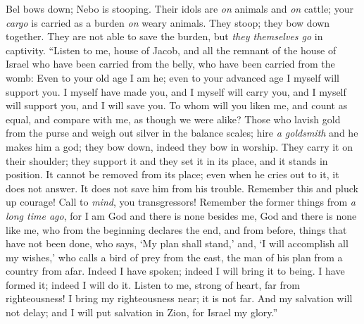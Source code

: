 \begin{biblechapter} %
 Bel bows down; 
Nebo is stooping. 
Their idols are \textit{on} animals and \textit{on} cattle; 
your \textit{cargo} is carried as a burden \textit{on} weary animals.
\verse They stoop; 
they bow down together. 
They are not able to save the burden, 
but \textit{they themselves go} in captivity.
\verse “Listen to me, house of Jacob, 
and all the remnant of the house of Israel 
who have been carried from the belly, 
who have been carried from the womb:
\verse Even to your old age I am he; 
even to your advanced age I myself will support you. 
I myself have made you, 
and I myself will carry you, 
and I myself will support you, 
and I will save you.
\verse To whom will you liken me, 
and count as equal, 
and compare with me, 
as though we were alike?
\verse Those who lavish gold from the purse 
and weigh out silver in the balance scales; 
hire \textit{a goldsmith} 
and he makes him a god; 
they bow down, 
indeed they bow in worship.
\verse They carry it on their shoulder; 
they support it and they set it in its place, 
and it stands in position. 
It cannot be removed from its place; 
even when he cries out to it, it does not answer. 
It does not save him from his trouble.
\verse Remember this and pluck up courage! 
Call to \textit{mind}, you transgressors!
\verse Remember the former things from \textit{a long time ago}, 
for I am God and there is none besides me, 
God and there is none like me,
\verse who from the beginning declares the end, 
and from before, things that have not been done, 
who says, ‘My plan shall stand,’ 
and, ‘I will accomplish all my wishes,’
\verse who calls a bird of prey from the east, 
the man of his plan from a country from afar. 
Indeed I have spoken; indeed I will bring it to being. 
I have formed it; indeed I will do it.
\verse Listen to me, strong of heart, 
far from righteousness!
\verse I bring my righteousness near; it is not far. 
And my salvation will not delay; 
and I will put salvation in Zion, 
for Israel my glory.”
\end{biblechapter}

